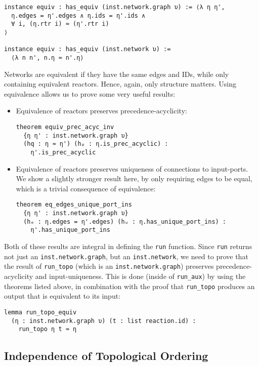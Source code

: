 \begin{lstlisting}
instance equiv : has_equiv (inst.network.graph υ) := ⟨λ η η', 
  η.edges = η'.edges ∧ η.ids = η'.ids ∧ 
  ∀ i, (η.rtr i) ≈ (η'.rtr i)
⟩

instance equiv : has_equiv (inst.network υ) := 
  ⟨λ n n', n.η ≈ n'.η⟩
\end{lstlisting}

\noindent Networks are equivalent if they have the same edges and IDs, while only containing equivalent reactors.
Hence, again, only structure matters.
Using equivalence allows us to prove some very useful results:

\begin{itemize}
  \item Equivalence of reactors preserves precedence-acyclicity:
\begin{lstlisting}
theorem equiv_prec_acyc_inv
  {η η' : inst.network.graph υ} 
  (hq : η ≈ η') (hₚ : η.is_prec_acyclic) :
    η'.is_prec_acyclic
\end{lstlisting}
  \item Equivalence of reactors preserves uniqueness of connections to input-ports. We show a slightly stronger result here, by only requiring edges to be equal, which is a trivial consequence of equivalence:
\begin{lstlisting}
theorem eq_edges_unique_port_ins 
  {η η' : inst.network.graph υ} 
  (hₑ : η.edges = η'.edges) (hᵤ : η.has_unique_port_ins) :
    η'.has_unique_port_ins
\end{lstlisting}
\end{itemize}

\noindent Both of these results are integral in defining the \lstinline{run} function.
Since \lstinline{run} returns not just an \lstinline{inst.network.graph}, but an \lstinline{inst.network}, we need to prove that the result of \lstinline{run_topo} (which is an \lstinline{inst.network.graph}) preserves precedence-acyclicity and input-uniqueness.
This is done (inside of \lstinline{run_aux}) by using the theorems listed above, in combination with the proof that \lstinline{run_topo} produces an output that is equivalent to its input: 

\begin{lstlisting}
lemma run_topo_equiv 
  (η : inst.network.graph υ) (t : list reaction.id) : 
    run_topo η t ≈ η
\end{lstlisting}

\subsection{Independence of Topological Ordering}
\label{section:indep}

